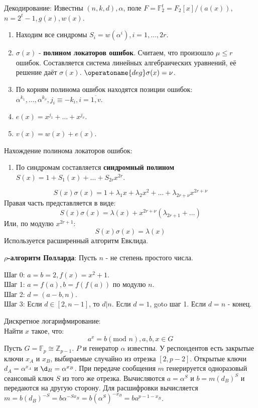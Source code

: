 \documentclass[11pt]{article}
\newcounter{th}\setcounter{th}{0}
\begin{document}
Декодирование:
Известны \((n, k, d), \alpha\), поле \(F = \mathbb{F}_2^t = F_2[x] / (a(x))\), \(n = 2^t - 1, g(x), w(x)\).
\begin{enumerate}
\item Находим все синдромы \(S_i = w(\alpha^i), i = 1, \ldots, 2r\).
\item \(\sigma(x)\) - \textbf{полином локаторов ошибок}. Считаем, что произошло \(\mu \leq r\) ошибок. Составляется система линейных алгебраических уравнений, её решение даёт \(\sigma(x)\). \(\operatoname{deg}\sigma(x) = \nu\).
\item По корням полинома ошибок находятся позиции ошибок: \(\alpha^{k_1}, \ldots, \alpha^{k_{\nu}}, j_i \equiv -k_i, i = \overline{1, v}\).
\item \(e(x) = x^{j_1} + \ldots + x^{j_{\nu}}\).
\item \(v(x) = w(x) + e(x)\).
\end{enumerate}
Нахождение полинома локаторов ошибок:
\begin{enumerate}
\item По синдромам составляется \textbf{синдромный полином} \(S(x) = 1 + S_1(x) + \ldots + S_{2r}x^{2r}\).
\end{enumerate}
$$S(x)\sigma(x) = 1 + \lambda_1x + \lambda_2x^2 + \ldots + \lambda_{2r + \nu}x^{2r + \nu}$$
Правая часть представляется в виде:
$$S(x)\sigma(x) = \lambda(x) + x^{2r + \nu}(\lambda_{2r + 1} + \ldots)$$
Или, по модулю \(x^{2r + 1}\):
$$S(x)\sigma(x) = \lambda(x)$$
Используется расширенный алгоритм Евклида.

\textbf{\(\rho\)-алгоритм Полларда}:
Пусть \(n\) - не степень простого числа.

Шаг 0: \(a = b = 2, f(x) = x^2 + 1\).\\
Шаг 1: \(a = f(a), b = f(f(a))\) по модулю \(n\).\\
Шаг 2: \(d = (a - b, n)\).\\
Шаг 3: Если \(d \in [2, n - 1]\), то \(d | n\). Если \(d = 1\), goto шаг 1. Если \(d = n\) - конец.

Дискретное логарифмирование:\\
Найти \(x\) такое, что:
\begin{equation}
a^x = b (\text{mod } n), a, b, x \in G
\end{equation}
Пусть $G = \mathbb{F}_p \cong \mathbb{Z}_{p - 1}$. $P$ и генератор $\alpha$ известны.
У респондентов есть закрытые ключи \(x_A\) и \(x_B\), выбираемые случайно из отрезка \([2, p - 2]\).
Открытые ключи \(d_A = \alpha^{x_A}\) и \(\d_B = \alpha^{x_B}\). При передаче сообщения \(m\) генерируется
одноразовый сеансовый ключ \(S\) из того же отрезка. Вычисляются \(a = \alpha^S\) и \(b = m(d_B)^S\)
и передаются на другую сторону. Для расшифровки вычисляется \(m = b(d_B)^{-S} = b\alpha^{-Sx_B}
= b(\alpha^S)^{-x_B} = ba^{p - 1 - x_B}\).
\end{document}
